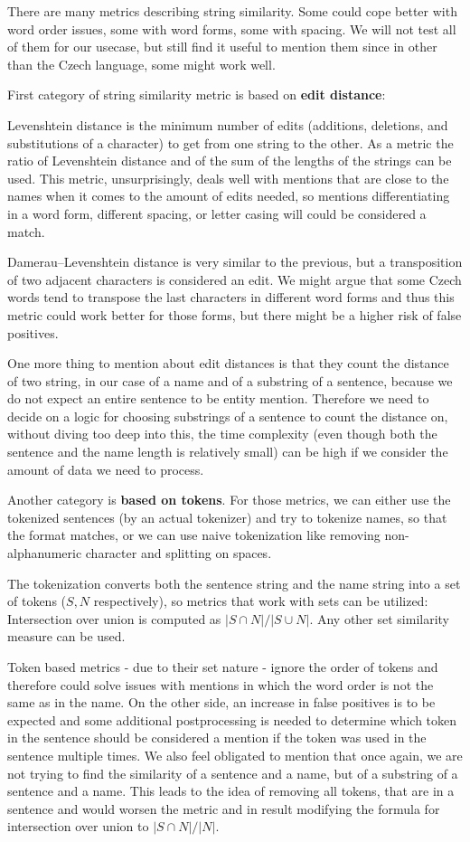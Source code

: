 There are many metrics describing string similarity. Some could cope better with word order issues, some with word forms, some with spacing. We will not test all of them for our usecase, but still find it useful to mention them since in other than the Czech language, some might work well.

First category of string similarity metric is based on \textbf{edit distance}:

Levenshtein distance is the minimum number of edits (additions, deletions, and substitutions of a character) to get from one string to the other. As a metric the ratio of Levenshtein distance and of the sum of the lengths of the strings can be used. This metric, unsurprisingly, deals well with mentions that are close to the names when it comes to the amount of edits needed, so mentions differentiating in a word form, different spacing, or letter casing will could be considered a match.

Damerau–Levenshtein distance is very similar to the previous, but a transposition of two adjacent characters is considered an edit. We might argue that some Czech words tend to transpose the last characters in different word forms and thus this metric could work better for those forms, but there might be a higher risk of false positives.

One more thing to mention about edit distances is that they count the distance of two string, in our case of a name and of a substring of a sentence, because we do not expect an entire sentence to be entity mention. Therefore we need to decide on a logic for choosing substrings of a sentence to count the distance on, without diving too deep into this, the time complexity (even though both the sentence and the name length is relatively small) can be high if we consider the amount of data we need to process. 

Another category is \textbf{based on tokens}. For those metrics, we can either use the tokenized sentences (by an actual tokenizer) and try to tokenize names, so that the format matches, or we can use naive tokenization like removing non-alphanumeric character and splitting on spaces.

The tokenization converts both the sentence string and the name string into a set of tokens ($S, N$ respectively), so metrics that work with sets can be utilized: Intersection over union is computed as $|S \cap N| / |S \cup N|$. Any other set similarity measure can be used. 

Token based metrics - due to their set nature - ignore the order of tokens and therefore could solve issues with mentions in which the word order is not the same as in the name. On the other side, an increase in false positives is to be expected and some additional postprocessing is needed to determine which token in the sentence should be considered a mention if the token was used in the sentence multiple times. We also feel obligated to mention that once again, we are not trying to find the similarity of a sentence and a name, but of a substring of a sentence and a name. This leads to the idea of removing all tokens, that are in a sentence and would worsen the metric and in result modifying the formula for intersection over union to  $|S \cap N| / |N|$.


